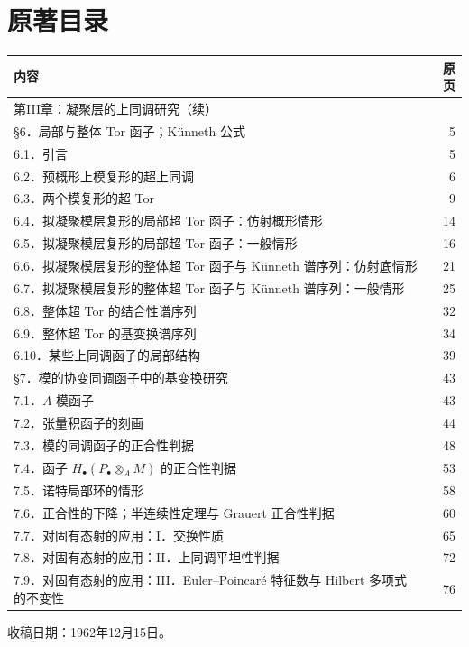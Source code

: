 \section*{原著目录}
\begin{longtable}{@{}p{.86\linewidth}r@{}}
\toprule 内容 & 原页\\\midrule\endhead
第III章：凝聚层的上同调研究（续）&\\
§6．局部与整体 Tor 函子；Künneth 公式 &5\\
6.1．引言 &5\\
6.2．预概形上模复形的超上同调 &6\\
6.3．两个模复形的超 Tor &9\\
6.4．拟凝聚模层复形的局部超 Tor 函子：仿射概形情形 &14\\
6.5．拟凝聚模层复形的局部超 Tor 函子：一般情形 &16\\
6.6．拟凝聚模层复形的整体超 Tor 函子与 Künneth 谱序列：仿射底情形 &21\\
6.7．拟凝聚模层复形的整体超 Tor 函子与 Künneth 谱序列：一般情形 &25\\
6.8．整体超 Tor 的结合性谱序列 &32\\
6.9．整体超 Tor 的基变换谱序列 &34\\
6.10．某些上同调函子的局部结构 &39\\
§7．模的协变同调函子中的基变换研究 &43\\
7.1．$A$-模函子 &43\\
7.2．张量积函子的刻画 &44\\
7.3．模的同调函子的正合性判据 &48\\
7.4．函子 $H_\bullet(P_\bullet\otimes_A M)$ 的正合性判据 &53\\
7.5．诺特局部环的情形 &58\\
7.6．正合性的下降；半连续性定理与 Grauert 正合性判据 &60\\
7.7．对固有态射的应用：I．交换性质 &65\\
7.8．对固有态射的应用：II．上同调平坦性判据 &72\\
7.9．对固有态射的应用：III．Euler--Poincaré 特征数与 Hilbert 多项式的不变性 &76\\
\bottomrule
\end{longtable}
\begin{flushright}收稿日期：1962年12月15日。\end{flushright}
